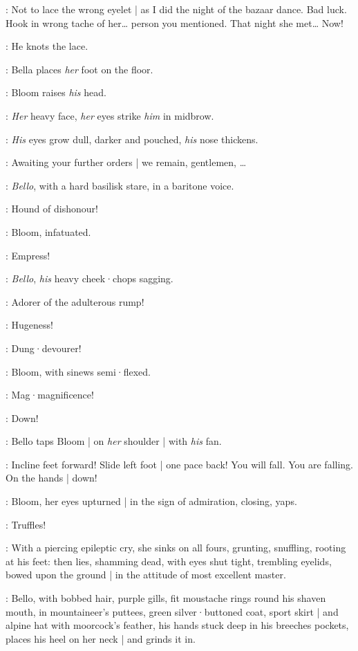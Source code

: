 \Bloom:
Not to lace the wrong eyelet |
as I did the night of the bazaar dance.
Bad luck.
Hook in wrong tache of her…
person you mentioned.
That night she met…
Now!

:
He knots the lace.


:
Bella places \emph{her} foot on the floor.

:
Bloom raises \emph{his} head.

:
\emph{Her} heavy face,
\emph{her} eyes strike \emph{him} in midbrow.

:
\emph{His} eyes grow dull,
darker and pouched,
\emph{his} nose thickens.

\Bloom:
Awaiting your further orders |
we remain,
gentlemen,
…

:
\emph{Bello},
with a hard basilisk stare,
in a baritone voice.

\Bello:
Hound of dishonour!

:
Bloom,
infatuated.

\Bloom:
Empress!

:
\emph{Bello},
\emph{his} heavy cheek·chops sagging.

\Bello:
Adorer of the adulterous rump!

\Bloom:
Hugeness!

\Bello:
Dung·devourer!

:
Bloom,
with sinews semi·flexed.

\Bloom:
Mag·magnificence!

\Bello:
Down!

:
Bello taps Bloom |
on \emph{her} shoulder |
with \emph{his} fan.

\Bello:
Incline feet forward!
Slide left foot |
one pace back!
You will fall.
You are falling.
On the hands |
down!

:
Bloom,
her eyes upturned |
in the sign of admiration,
closing,
yaps.

\Bloom:
Truffles!

:
With a piercing epileptic cry,
she sinks on all fours,
grunting,
snuffling,
rooting at his feet:
then lies,
shamming dead,
with eyes shut tight,
trembling eyelids,
bowed upon the ground |
in the attitude of most excellent master.

:
Bello,
with bobbed hair,
purple gills,
fit moustache rings round his shaven mouth,
in mountaineer's puttees,
green silver·buttoned coat,
sport skirt |
and alpine hat with moorcock's feather,
his hands stuck deep in his breeches pockets,
places his heel on her neck |
and grinds it in.

